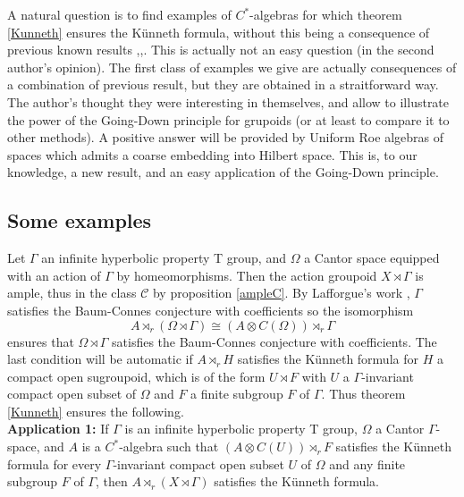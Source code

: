 A natural question is to find examples of $C^*$-algebras for which theorem \ref{Kunneth} ensures the Künneth formula, without this being a consequence of previous known results \cite{RosenbergKunneth},\cite{ChabertEOY},\cite{OY4}. This is actually not an easy question (in the second author's opinion). The first class of examples we give are actually consequences of a combination of previous result, but they are obtained in a straitforward way. The author's thought they were interesting in themselves, and allow to illustrate the power of the Going-Down principle for grupoids (or at least to compare it to other methods). A positive answer will be provided by Uniform Roe algebras of spaces which admits a coarse embedding into Hilbert space. This is, to our knowledge, a new result, and an easy application of the Going-Down principle.\\ %

\subsection{Some examples}

Let $\Gamma$ an infinite hyperbolic property T group, and $\Omega$ a Cantor space equipped with an action of $\Gamma$ by homeomorphisms. Then the action groupoid $X\rtimes \Gamma$ is ample, thus in the class $\mathcal C$ by proposition \ref{ampleC}. By Lafforgue's work \cite{lafforgue2012conjecture}, $\Gamma$ satisfies the Baum-Connes conjecture with coefficients so the isomorphism \[A\rtimes_r (\Omega\rtimes \Gamma) \cong (A\otimes C(\Omega))\rtimes_r \Gamma \]
ensures that $\Omega\rtimes \Gamma$ satisfies the Baum-Connes conjecture with coefficients. The last condition will be automatic if $A\rtimes_r H$ satisfies the Künneth formula for $H$ a compact open sugroupoid, which is of the form $U\rtimes F $ with $U $ a $\Gamma$-invariant compact open subset of $\Omega$ and $F$ a finite subgroup $F$ of $\Gamma$. Thus theorem \ref{Kunneth} ensures the following.\\

\textbf{Application 1: } If $\Gamma$ is an infinite hyperbolic property T group, $\Omega$ a Cantor $\Gamma$-space, and $A$ is a $C^*$-algebra such that $(A\otimes C(U))\rtimes_r F$ satisfies the Künneth formula for every $\Gamma$-invariant compact open subset $U$ of $\Omega$ and any finite subgroup $F$ of $\Gamma$, then $A \rtimes_r (X\rtimes \Gamma)$ satisfies the Künneth formula. \\ 

